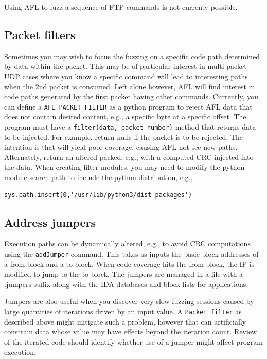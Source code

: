 \documentclass[titlepage]{article}
\begin{document}
Using AFL to fuzz a sequence of FTP commands is not currenty possible.


\subsection{Packet filters}
Sometimes you may wish to focus the fuzzing on a specific code path determined by data within the packet.  This may be of particular
interest in multi-packet UDP cases where you know a specific command will lead to interesting paths when the 2nd packet is consumed.
Left alone however, AFL will find interest in code paths generated by the first packet having other commands.  Currently, you can
define a {\tt AFL\_PACKET\_FILTER} as a python program to reject AFL data that does not contain desired content, e.g., a specific byte
at a specific offset.  The program must have a {\tt filter(data, packet\_number)} method that returns data to be injected.  
For example, return nulls if the packet is to be rejected.  The intention is that will yield poor coverage, causing AFL not see new paths.
Alternately, return an altered packed, e.g., with a computed CRC injected into the data.
When creating filter modules, you may need to modify the python module search path to include the python distribution, e.g., 
\begin{verbatim}
sys.path.insert(0,'/usr/lib/python3/dist-packages')
\end{verbatim}

\subsection{Address jumpers}
\label{jumpers}
Execution paths can be dynamically altered, e.g., to avoid CRC computations using the {\tt addJumper} command.  This takes as inputs
the basic block addresses of a from-block and a to-block. When code coverage hits the from-block, the IP is modified to jump to the
to-block.  The jumpers are managed in a file with a .jumpers suffix along with the IDA databases and block lists for applications.

Jumpers are also useful when you discover very slow fuzzing sessions caused by large quantities of iterations driven by an input value.
A {\tt Packet filter} as described above might mitigate such a problem, however that can artificially constrain data whose value may
have effects beyond the iteration count.  Review of the iterated code should identify whether use of a jumper might affect program
execution.
\end{document}
